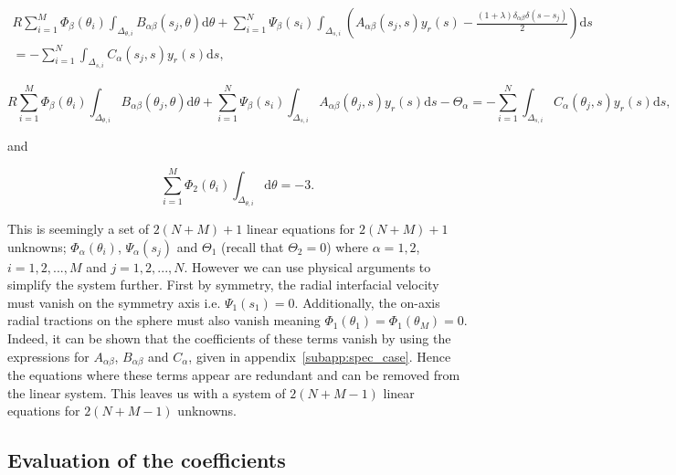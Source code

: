 \documentclass[12pt]{article}
\begin{document}
\begin{align}
\label{equ:dis_ie_1}
R \sum_{i = 1}^{M} \Phi_{\beta}(\theta_{i}) \int_{\Delta_{\theta,i}} B_{\alpha\beta}(s_{j},\theta) \mathrm{d}\theta + \sum_{i=1}^{N} \Psi_{\beta}(s_{i}) \int_{\Delta_{s,i}} \left(A_{\alpha\beta}(s_{j},s) y_{r}(s) - \frac{(1 + \lambda) \delta_{\alpha\beta} \delta(s - s_{j})}{2}\right) \mathrm{d}s \nonumber \\
= - \sum_{i = 1}^{N} \int_{\Delta_{s,i}} C_{\alpha}(s_{j},s) y_{r}(s) \mathrm{d}s,
\end{align}

\begin{equation}
\label{equ:dis_ie_2}
R \sum_{i = 1}^{M} \Phi_{\beta}(\theta_{i}) \int_{\Delta_{\theta,i}} B_{\alpha\beta}(\theta_{j},\theta) \mathrm{d}\theta + \sum_{i=1}^{N} \Psi_{\beta}(s_{i}) \int_{\Delta_{s,i}} A_{\alpha\beta}(\theta_{j},s) y_{r}(s) \mathrm{d}s - \Theta_{\alpha} = - \sum_{i = 1}^{N} \int_{\Delta_{s,i}} C_{\alpha}(\theta_{j},s) y_{r}(s) \mathrm{d}s,
\end{equation}

and 

\begin{equation}
\label{equ:dis_ie_3}
\sum_{i = 1}^{M} \Phi_{2}(\theta_{i}) \int_{\Delta_{\theta,i}} \mathrm{d}\theta = -3.
\end{equation}

This is seemingly a set of $2(N + M) + 1$ linear equations for $2(N + M) + 1$ unknowns; $\Phi_{\alpha}(\theta_{i})$, $\Psi_{\alpha}(s_{j})$ and $\Theta_{1}$ (recall that $\Theta_{2} = 0$) where $\alpha = 1,2$, $i = 1,2,...,M$ and $j = 1,2,...,N$. However we can use physical arguments to simplify the system further. First by symmetry, the radial interfacial velocity must vanish on the symmetry axis i.e. $\Psi_{1}(s_{1}) = 0$. Additionally, the on-axis radial tractions on the sphere must also vanish meaning $\Phi_{1}(\theta_{1}) = \Phi_{1}(\theta_{M}) = 0$. Indeed, it can be shown that the coefficients of these terms vanish by using the expressions for $A_{\alpha\beta}$, $B_{\alpha\beta}$ and $C_{\alpha}$, given in appendix~\ref{subapp:spec_case}. Hence the equations where these terms appear are redundant and can be removed from the linear system. This leaves us with a system of $2(N + M - 1)$ linear equations for $2(N + M - 1)$ unknowns.

\subsection{Evaluation of the coefficients}
\label{subsec:eval_coeff}
\end{document}
